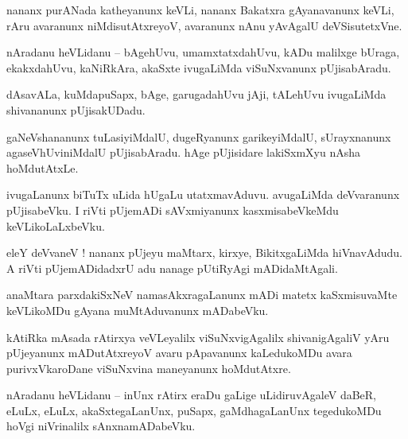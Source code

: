 \documentclass{article}
\begin{document}
\begin{mn}%
nananx purANada katheyanunx keVLi, nananx Bakatxra gAyanavanunx keVLi, rAru avaranunx 
niMdisutAtxreyoV, avaranunx nAnu yAvAgalU deVSisutetxVne.
\end{mn}

\begin{mn}%
nAradanu heVLidanu -- bAgehUvu, umamxtatxdahUvu, kADu malilxge bUraga, ekakxdahUvu, kaNiRkAra, 
akaSxte ivugaLiMda viSuNxvanunx pUjisabAradu.
\end{mn}

\begin{mn}%
dAsavALa, kuMdapuSapx, bAge, garugadahUvu jAji, tALehUvu ivugaLiMda shivananunx pUjisakUDadu.
\end{mn}

\begin{mn}%
gaNeVshananunx tuLasiyiMdalU, dugeRyanunx garikeyiMdalU, sUrayxnanunx agaseVhUviniMdalU 
pUjisabAradu. hAge pUjisidare lakiSxmXyu nAsha hoMdutAtxLe.
\end{mn}

\begin{mn}%
ivugaLanunx biTuTx uLida hUgaLu utatxmavAduvu. avugaLiMda deVvaranunx pUjisabeVku. I riVti pUjemADi 
sAVxmiyanunx kasxmisabeVkeMdu keVLikoLaLxbeVku.
\end{mn}

\begin{mn}%
eleY deVvaneV ! nananx pUjeyu maMtarx, kirxye, BikitxgaLiMda hiVnavAdudu. A riVti pUjemADidadxrU 
adu nanage pUtiRyAgi mADidaMtAgali.
\end{mn}

\begin{mn}%
anaMtara parxdakiSxNeV namasAkxragaLanunx mADi matetx kaSxmisuvaMte keVLikoMDu gAyana muMtAduvanunx 
mADabeVku.
\end{mn}

\begin{mn}%
kAtiRka mAsada rAtirxya veVLeyalilx viSuNxvigAgalilx shivanigAgaliV yAru pUjeyanunx mADutAtxreyoV 
avaru pApavanunx kaLedukoMDu avara purivxVkaroDane viSuNxvina maneyanunx hoMdutAtxre.
\end{mn}


\begin{mn}%
nAradanu heVLidanu -- inUnx rAtirx eraDu gaLige uLidiruvAgaleV daBeR, eLuLx, eLuLx, 
akaSxtegaLanUnx, puSapx, gaMdhagaLanUnx tegedukoMDu hoVgi niVrinalilx sAnxnamADabeVku.
\end{mn}
\end{document}
